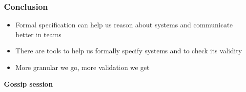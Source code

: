 \documentclass{beamer}
\begin{document}
\begin{frame}
    \frametitle{Conclusion}
    \begin{itemize}
        \item Formal specification can help us reason about systems and communicate better in teams
        \item There are tools to help us formally specify systems and to check its validity 
        \item More granular we go, more validation we get
    \end{itemize}
\end{frame}

\begin{frame}
    \begin{center}
        \LARGE{\textbf{Gossip session}}
    \end{center}

\end{frame}
\end{document}
